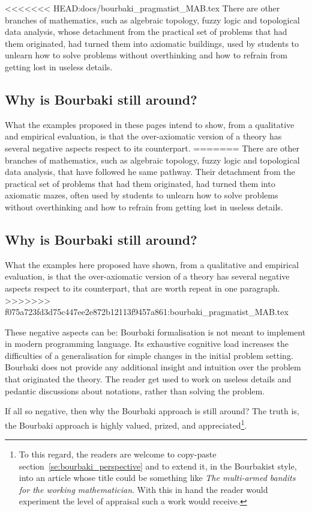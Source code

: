 \documentclass[]{scrartcl}
\theoremstyle{definition}
\begin{document}
<<<<<<< HEAD:docs/bourbaki_pragmatist_MAB.tex
There are other branches of mathematics, such as algebraic topology, fuzzy logic and topological data analysis, whose detachment from the practical set of problems that had them originated, had turned them into axiomatic buildings, used by students to unlearn how to solve problems without overthinking and how to refrain from getting lost in useless details.

\subsection*{Why is Bourbaki still around?}

What the examples proposed in these pages intend to show, from a qualitative and empirical evaluation, is that the over-axiomatic version of a theory has several negative aspects respect to its counterpart.
=======
There are other branches of mathematics, such as algebraic topology, fuzzy logic and topological data analysis, that have followed he same pathway. Their detachment from the practical set of problems that had them originated, had turned them into axiomatic mazes, often used by students to unlearn how to solve problems without overthinking and how to refrain from getting lost in useless details.

\subsection*{Why is Bourbaki still around?}

What the examples here proposed have shown, from a qualitative and empirical evaluation, is that the over-axiomatic version of a theory has several negative aspects respect to its counterpart, that are worth repeat in one paragraph.
>>>>>>> f075a723fd3d75c447ee2e872b12113f9457a861:bourbaki_pragmatist_MAB.tex

These negative aspects can be: Bourbaki formalisation is not meant to implement in modern programming language. Its exhaustive cognitive load increases the difficulties of a generalisation for simple changes in the initial problem setting. Bourbaki does not provide any additional insight and intuition over the problem that originated the theory. The reader get used to work on useless details and pedantic discussions about notations, rather than solving the problem.

If all so negative, then why the Bourbaki approach is still around? The truth is, the Bourbaki approach is highly valued, prized, and appreciated\footnote{
    To this regard, the readers are welcome to copy-paste section~\ref{se:bourbaki_perspective} and to extend it, in the Bourbakist style, into an article whose title could be something like \emph{The multi-armed bandits for the working mathematician}. With this in hand the reader would experiment the level of appraisal such a work would receive.
}.
\end{document}
